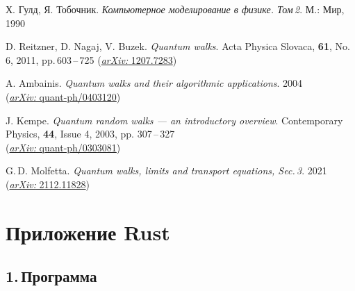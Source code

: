 \documentclass[a4paper]{report}
\begin{document}
\begin{thebibliography}{99}

Х. Гулд, Я. Тобочник. \textit{Компьютерное моделирование в физике. Том\,2}. М.: Мир, 1990

D. Reitzner, D. Nagaj, V. Buzek. \textit{Quantum walks}. Acta Physica Slovaca, \textbf{61}, No.\,6, 2011, pp.\,603\,--\,725
(\href{https://arxiv.org/abs/1207.7283}{\textit{arXiv:} 1207.7283})

A. Ambainis. \textit{Quantum walks and their algorithmic applications}. 2004\\ (\href{https://arxiv.org/abs/quant-ph/040312} {\textit{arXiv:} quant-ph/0403120})

J. Kempe. \textit{Quantum random walks --- an introductory overview}. Contemporary Physics, \textbf{44}, Issue 4, 2003, pp. 307\,--\,327\\ (\href{https://arxiv.org/abs/quant-ph/0303081} {\textit{arXiv:} quant-ph/0303081})

G.\,D. Molfetta. \textit{Quantum walks, limits and transport equations, Sec.\,3}. 2021
(\href{https://arxiv.org/abs/2112.11828}{\textit{arXiv:} 2112.11828})

\end{thebibliography}

\newpage
{}

\chapter*{Приложение {\huge Rust}}
\section*{1.\,Программа}
\end{document}
